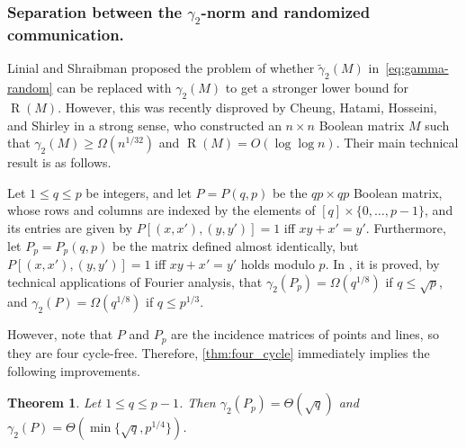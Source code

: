 \documentclass[11pt]{amsart}
\theoremstyle{plain}
\newtheorem{theorem}{Theorem}[section]
\theoremstyle{definition}
\DeclareMathOperator{\R}{R}
\begin{document}
\subsubsection{Separation between the $\gamma_2$-norm and randomized communication.} Linial and Shraibman \cite{LS} proposed the problem of whether $\tilde{\gamma}_2(M)$ in~\eqref{eq:gamma-random} can be replaced with $\gamma_2(M)$ to get a stronger lower bound for $\R(M)$. However, this was recently disproved by  Cheung,  Hatami, Hosseini, and Shirley \cite{CHHS} in a strong sense, who constructed an $n\times n$  Boolean matrix $M$ such that $\gamma_2(M)\geq \Omega(n^{1/32})$ and $\R(M)=O(\log \log n)$. Their main technical result is as follows. 

Let $1\leq q\leq p$ be integers, and let $P=P(q,p)$ be the $qp\times qp$ Boolean matrix, whose rows and columns are indexed by the elements of $[q]\times \{0,\dots,p-1\}$, and its entries are given by $P[(x,x'),(y,y')]=1$ iff $xy+x'=y'$. Furthermore, let $P_p=P_p(q,p)$ be the matrix defined almost identically, but $P[(x,x'),(y,y')]=1$ iff $xy+x'=y'$ holds modulo $p$. In \cite{CHHS}, it is proved, by technical applications of Fourier analysis, that $\gamma_2(P_p)=\Omega(q^{1/8})$ if $q\leq \sqrt{p}$, and $\gamma_2(P)=\Omega(q^{1/8})$ if $q\leq p^{1/3}$.

However, note that $P$ and $P_p$ are the incidence matrices of points and lines, so they are four cycle-free. Therefore, \cref{thm:four_cycle} immediately implies the following improvements.

\begin{theorem}
Let $1\leq q\leq p-1$. Then  $\gamma_2(P_p)=\Theta(\sqrt{q})$ and $\gamma_2(P)=\Theta(\min\{\sqrt{q},p^{1/4}\})$.
\end{theorem}
\end{document}
